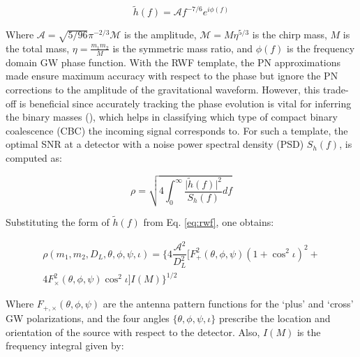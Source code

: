         \begin{equation}
            \tilde{h}(f) = \mathcal{A}f^{-7/6}e^{i\phi(f)}
            \label{eq:rwf}
        \end{equation}

        Where $\mathcal{A} = \sqrt{5/96}\pi^{-2/3} \mathcal{M}$ is the amplitude,
        $\mathcal{M} = M \eta^{5/3}$ is the chirp mass, $M$ is the total mass, $\eta =
        \frac{m_1 m_2}{M}$ is the symmetric mass ratio, and $\phi(f)$ is the frequency
        domain GW phase function. With the RWF template, the PN approximations made
        ensure maximum accuracy with respect to the phase but ignore the PN corrections
        to the amplitude of the gravitational waveform. However, this trade-off is
        beneficial since accurately tracking the phase evolution is vital for
        inferring the binary masses (\cite{poisson_1995}), which helps in classifying
        which type of compact binary coalescence (CBC) the incoming signal corresponds
        to. For such a template, the optimal SNR at a detector with a noise power
        spectral density (PSD) $S_h(f)$, is computed as:

        \begin{equation}
            \rho = \sqrt{
                            4\int_0^\infty
                            \dfrac{\lvert \tilde{h}(f) \rvert^2}{S_h(f)}
                            df
                        }
            \label{eq:rho}
        \end{equation}

        Substituting the form of $\tilde{h}(f)$ from Eq. \ref{eq:rwf}, one obtains:

        \begin{multline}
            \label{eq:rwf_optsnr}
            \rho(m_1, m_2, D_L, \theta, \phi, \psi, \iota) =
                \Big\{
                    4 \dfrac{\mathcal{A}^2}{D_L^2}
                    \Big[
                        F_{+}^2(\theta, \phi, \psi)(1 + \cos^2 \iota)^2 + \\
                        4 F_{\times}^2(\theta, \phi, \psi) \cos^2 \iota
                    \Big]
                     I(M)
                 \Big\}^{1/2}
        \end{multline}

        Where $F_{+, \times}(\theta, \phi, \psi)$ are the antenna pattern functions for
        the `plus' and `cross' GW polarizations, and the four angles $\{\theta, \phi,
        \psi, \iota\}$ prescribe the location and orientation of the source with respect
        to the detector. Also, $I(M)$ is the frequency integral given by:

